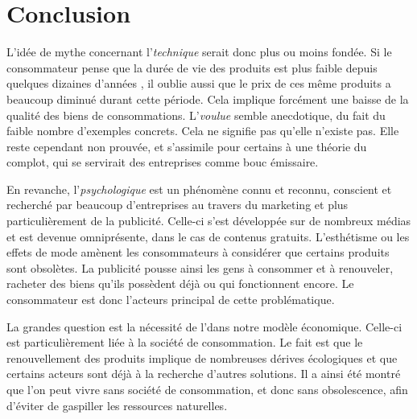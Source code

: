 \chapter*{Conclusion}

%
%
%
%
%

L'idée de mythe concernant l'\op \textit{technique} serait donc plus ou moins fondée. Si le consommateur pense que la durée de vie des produits est plus faible depuis quelques dizaines d'années , il oublie aussi que le prix de ces même produits a beaucoup diminué durant cette période. Cela implique forcément une baisse de la qualité des biens de consommations. L'\op \textit{voulue} semble anecdotique, du fait du faible nombre d'exemples concrets. Cela ne signifie pas qu'elle n'existe pas. Elle reste cependant non prouvée, et s'assimile pour certains à une théorie du complot, qui se servirait des entreprises comme bouc émissaire. 

\bigbreak
En revanche, l'\op \textit{psychologique} est un phénomène connu et reconnu, conscient et recherché par beaucoup d'entreprises au travers du marketing et plus particulièrement de la publicité. Celle-ci s'est développée sur de nombreux médias et est devenue omniprésente, dans le cas de contenus gratuits. L'esthétisme ou les effets de mode amènent les consommateurs à considérer que certains produits sont obsolètes. La publicité pousse ainsi les gens à consommer et à renouveler, racheter des biens qu'ils possèdent déjà ou qui fonctionnent encore. Le consommateur est donc l'acteurs principal de cette problématique.

\bigbreak
La grandes question est la nécessité de l'\op dans notre modèle économique. Celle-ci est particulièrement liée à la société de consommation. Le fait est que le renouvellement des produits implique de nombreuses dérives écologiques et que certains acteurs sont déjà à la recherche d'autres solutions. Il a ainsi été montré que l'on peut vivre sans société de consommation, et donc sans obsolescence, afin d'éviter de gaspiller les ressources naturelles.
